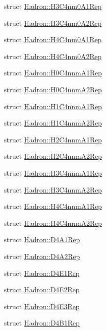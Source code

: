 \begin{DoxyCompactItemize}
\item 
struct \mbox{\hyperlink{structHadron_1_1H3C4nm0A1Rep}{Hadron\+::\+H3\+C4nm0\+A1\+Rep}}
\item 
struct \mbox{\hyperlink{structHadron_1_1H3C4nm0A2Rep}{Hadron\+::\+H3\+C4nm0\+A2\+Rep}}
\item 
struct \mbox{\hyperlink{structHadron_1_1H4C4nm0A1Rep}{Hadron\+::\+H4\+C4nm0\+A1\+Rep}}
\item 
struct \mbox{\hyperlink{structHadron_1_1H4C4nm0A2Rep}{Hadron\+::\+H4\+C4nm0\+A2\+Rep}}
\item 
struct \mbox{\hyperlink{structHadron_1_1H0C4nnmA1Rep}{Hadron\+::\+H0\+C4nnm\+A1\+Rep}}
\item 
struct \mbox{\hyperlink{structHadron_1_1H0C4nnmA2Rep}{Hadron\+::\+H0\+C4nnm\+A2\+Rep}}
\item 
struct \mbox{\hyperlink{structHadron_1_1H1C4nnmA1Rep}{Hadron\+::\+H1\+C4nnm\+A1\+Rep}}
\item 
struct \mbox{\hyperlink{structHadron_1_1H1C4nnmA2Rep}{Hadron\+::\+H1\+C4nnm\+A2\+Rep}}
\item 
struct \mbox{\hyperlink{structHadron_1_1H2C4nnmA1Rep}{Hadron\+::\+H2\+C4nnm\+A1\+Rep}}
\item 
struct \mbox{\hyperlink{structHadron_1_1H2C4nnmA2Rep}{Hadron\+::\+H2\+C4nnm\+A2\+Rep}}
\item 
struct \mbox{\hyperlink{structHadron_1_1H3C4nnmA1Rep}{Hadron\+::\+H3\+C4nnm\+A1\+Rep}}
\item 
struct \mbox{\hyperlink{structHadron_1_1H3C4nnmA2Rep}{Hadron\+::\+H3\+C4nnm\+A2\+Rep}}
\item 
struct \mbox{\hyperlink{structHadron_1_1H4C4nnmA1Rep}{Hadron\+::\+H4\+C4nnm\+A1\+Rep}}
\item 
struct \mbox{\hyperlink{structHadron_1_1H4C4nnmA2Rep}{Hadron\+::\+H4\+C4nnm\+A2\+Rep}}
\item 
struct \mbox{\hyperlink{structHadron_1_1D4A1Rep}{Hadron\+::\+D4\+A1\+Rep}}
\item 
struct \mbox{\hyperlink{structHadron_1_1D4A2Rep}{Hadron\+::\+D4\+A2\+Rep}}
\item 
struct \mbox{\hyperlink{structHadron_1_1D4E1Rep}{Hadron\+::\+D4\+E1\+Rep}}
\item 
struct \mbox{\hyperlink{structHadron_1_1D4E2Rep}{Hadron\+::\+D4\+E2\+Rep}}
\item 
struct \mbox{\hyperlink{structHadron_1_1D4E3Rep}{Hadron\+::\+D4\+E3\+Rep}}
\item 
struct \mbox{\hyperlink{structHadron_1_1D4B1Rep}{Hadron\+::\+D4\+B1\+Rep}}

\end{DoxyCompactItemize}

